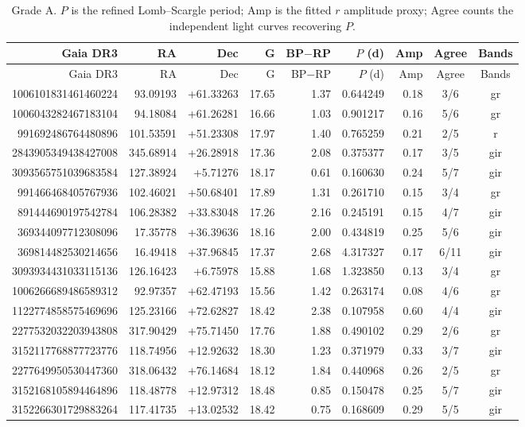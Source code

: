 \documentclass[11pt]{article}
\begin{document}
{\small\setlength{\tabcolsep}{3.5pt}
\begin{longtable}{rrrrrrrcc}
\caption{Grade A. $P$ is the refined Lomb--Scargle period; Amp is the fitted $r$ amplitude proxy; Agree counts the independent light curves recovering $P$.}\\
\toprule Gaia DR3 & RA & Dec & G & BP$-$RP & $P$ (d) & Amp & Agree & Bands\\\midrule\endfirsthead
\toprule Gaia DR3 & RA & Dec & G & BP$-$RP & $P$ (d) & Amp & Agree & Bands\\\midrule\endhead
1006101831461460224 & 93.09193 & +61.33263 & 17.65 & 1.37 & 0.644249 & 0.18 & 3/6 & gr \\
1006043282467183104 & 94.18084 & +61.26281 & 16.66 & 1.03 & 0.901217 & 0.16 & 5/6 & gr \\
991692486764480896 & 101.53591 & +51.23308 & 17.97 & 1.40 & 0.765259 & 0.21 & 2/5 & r \\
2843905349438427008 & 345.68914 & +26.28918 & 17.36 & 2.08 & 0.375377 & 0.17 & 3/5 & gir \\
3093565751039683584 & 127.38924 & +5.71276 & 18.17 & 0.61 & 0.160630 & 0.24 & 5/7 & gir \\
991466468405767936 & 102.46021 & +50.68401 & 17.89 & 1.31 & 0.261710 & 0.15 & 3/4 & gr \\
891444690197542784 & 106.28382 & +33.83048 & 17.26 & 2.16 & 0.245191 & 0.15 & 4/7 & gir \\
369344097712308096 & 17.35778 & +36.39636 & 18.16 & 2.00 & 0.434819 & 0.25 & 5/6 & gir \\
369814482530214656 & 16.49418 & +37.96845 & 17.37 & 2.68 & 4.317327 & 0.17 & 6/11 & gir \\
3093934431033115136 & 126.16423 & +6.75978 & 15.88 & 1.68 & 1.323850 & 0.13 & 3/4 & gr \\
1006266689486589312 & 92.97357 & +62.47193 & 15.56 & 1.42 & 0.263174 & 0.08 & 4/6 & gr \\
1122774858575469696 & 125.23166 & +72.62827 & 18.42 & 2.38 & 0.107958 & 0.60 & 4/4 & gir \\
2277532032203943808 & 317.90429 & +75.71450 & 17.76 & 1.88 & 0.490102 & 0.29 & 2/6 & gr \\
3152117768877723776 & 118.74956 & +12.92632 & 18.30 & 1.23 & 0.371979 & 0.33 & 3/7 & gir \\
2277649950530447360 & 318.06432 & +76.14684 & 18.12 & 1.84 & 0.440968 & 0.26 & 2/5 & gr \\
3152168105894464896 & 118.48778 & +12.97312 & 18.48 & 0.85 & 0.150478 & 0.25 & 5/7 & gir \\
3152266301729883264 & 117.41735 & +13.02532 & 18.42 & 0.75 & 0.168609 & 0.29 & 5/5 & gir \\
\bottomrule\end{longtable}}
\end{document}
